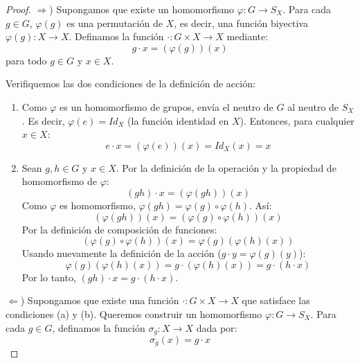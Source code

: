 \begin{proof}
    $\Rightarrow$) Supongamos que existe un homomorfismo $\varphi: G \to S_X$.
    Para cada $g \in G$, $\varphi(g)$ es una permutación de $X$, es decir, una función biyectiva $\varphi(g): X \to X$.
    Definamos la función $\cdot: G \times X \to X$ mediante:
    \begin{equation*}
        g \cdot x = (\varphi(g))(x)
    \end{equation*}
    para todo $g \in G$ y $x \in X$.
    
    Verifiquemos las dos condiciones de la definición de acción:
    \begin{enumerate}
        \item[(i)] Como $\varphi$ es un homomorfismo de grupos, envía el neutro de $G$ al neutro de $S_X$. Es decir, $\varphi(e) = Id_X$ (la función identidad en $X$).
        Entonces, para cualquier $x \in X$:
        \begin{equation*}
            e \cdot x = (\varphi(e))(x) = Id_X(x) = x
        \end{equation*}
        
        \item[(ii)] Sean $g, h \in G$ y $x \in X$.
        Por la definición de la operación y la propiedad de homomorfismo de $\varphi$:
        \begin{equation*}
            (gh) \cdot x = (\varphi(gh))(x)
        \end{equation*}
        Como $\varphi$ es homomorfismo, $\varphi(gh) = \varphi(g) \circ \varphi(h)$. Así:
        \begin{equation*}
            (\varphi(gh))(x) = (\varphi(g) \circ \varphi(h))(x)
        \end{equation*}
        Por la definición de composición de funciones:
        \begin{equation*}
            (\varphi(g) \circ \varphi(h))(x) = \varphi(g)(\varphi(h)(x))
        \end{equation*}
        Usando nuevamente la definición de la acción ($g \cdot y = \varphi(g)(y)$):
        \begin{equation*}
            \varphi(g)(\varphi(h)(x)) = g \cdot (\varphi(h)(x)) = g \cdot (h \cdot x)
        \end{equation*}
        Por lo tanto, $(gh) \cdot x = g \cdot (h \cdot x)$.
    \end{enumerate}

    $\Leftarrow$) Supongamos que existe una función $\cdot: G \times X \to X$ que satisface las condiciones (a) y (b).
    Queremos construir un homomorfismo $\varphi: G \to S_X$.
    Para cada $g \in G$, definamos la función $\sigma_g: X \to X$ dada por:
    \begin{equation*}
        \sigma_g(x) = g \cdot x
    \end{equation*}
    

\end{proof}
